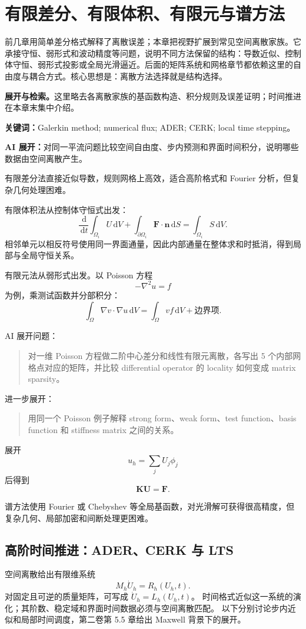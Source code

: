 \documentclass[11pt,openany]{ctexbook}
\newcommand{\dd}{\,\mathrm d}
\newcommand{\studyroute}[3]{%
  \par\smallskip\noindent\textbf{展开与检索。}#1\par
  \noindent\textbf{关键词：}#2。\par
  \noindent\textbf{AI 展开：}#3\par
}
\begin{document}
\chapter{有限差分、有限体积、有限元与谱方法}

\begin{chaptersummary}
前几章用简单差分格式解释了离散误差；本章把视野扩展到常见空间离散家族。它承接守恒、弱形式和波动精度等问题，说明不同方法保留的结构：导数近似、控制体守恒、弱形式投影或全局光滑逼近。后面的矩阵系统和网格章节都依赖这里的自由度与耦合方式。核心思想是：离散方法选择就是结构选择。
\end{chaptersummary}
\studyroute{这里略去各离散家族的基函数构造、积分规则及误差证明；时间推进在本章末集中介绍。}{Galerkin method; numerical flux; ADER; CERK; local time stepping}{对同一平流问题比较空间自由度、步内预测和界面时间积分，说明哪些数据由空间离散产生。}

有限差分法直接近似导数，规则网格上高效，适合高阶格式和 Fourier 分析，但复杂几何处理困难。

有限体积法从控制体守恒式出发：
\[
\frac{\dd}{\dd t}
\int_{\Omega_i}U\dd V
+
\int_{\partial\Omega_i}
\bm F\cdot\bm n\dd S
=
\int_{\Omega_i}S\dd V.
\]
相邻单元以相反符号使用同一界面通量，因此内部通量在整体求和时抵消，得到局部与全局守恒关系。

有限元法从弱形式出发。以 Poisson 方程
\[
-\nabla^2u=f
\]
为例，乘测试函数并分部积分：
\[
\int_\Omega\nabla v\cdot\nabla u\dd V
=
\int_\Omega vf\dd V+\text{边界项}.
\]

\begin{askai}
AI 展开问题：
\begin{quote}
对一维 Poisson 方程做二阶中心差分和线性有限元离散，各写出 5 个内部网格点对应的矩阵，并比较 differential operator 的 locality 如何变成 matrix sparsity。
\end{quote}

进一步展开：
\begin{quote}
用同一个 Poisson 例子解释 strong form、weak form、test function、basis function 和 stiffness matrix 之间的关系。
\end{quote}
\end{askai}

展开
\[
u_h=\sum_jU_j\phi_j
\]
后得到
\[
\bm K\bm U=\bm F.
\]

谱方法使用 Fourier 或 Chebyshev 等全局基函数，对光滑解可获得很高精度，但复杂几何、局部加密和间断处理更困难。

\section{高阶时间推进：ADER、CERK 与 LTS}\label{sec:v1-time}
空间离散给出有限维系统
\[
M_h\dot U_h=R_h(U_h,t).
\]
对固定且可逆的质量矩阵，可写成 $\dot U_h=L_h(U_h,t)$。
时间格式近似这一系统的演化；其阶数、稳定域和界面时间数据必须与空间离散匹配。
以下分别讨论步内近似和局部时间调度，第二卷第 5.5 章给出 Maxwell 背景下的展开。
\end{document}
